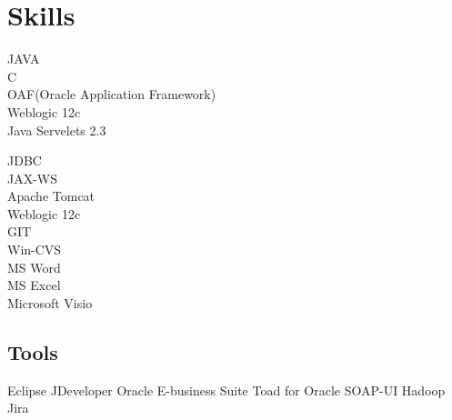 \documentclass[letterpaper]{deedy-resume-openfont}
\begin{document}
\begin{minipage}[t]{0.33\textwidth}

\section{Skills}
\hspace{.5cm} \textbullet{} JAVA\\
\hspace{.5cm} \textbullet{} C\\

\hspace{.5cm}  \textbullet{} OAF(Oracle Application Framework) \\
\hspace{.5cm} \textbullet{} Weblogic 12c\\


\hspace{.5cm} \textbullet{} Java Servelets 2.3\\



\hspace{.5cm} \textbullet{} JDBC\\
\hspace{.5cm} \textbullet{} JAX-WS\\


\hspace{.5cm} \textbullet{} Apache Tomcat\\ 
\hspace{.5cm} \textbullet{} Weblogic 12c\\

\hspace{.5cm} \textbullet{} GIT\\ 
\hspace{.5cm} \textbullet{} Win-CVS\\

\hspace{.5cm} \textbullet{} MS Word\\ 
\hspace{.5cm} \textbullet{} MS Excel\\
\hspace{.5cm} \textbullet{} Microsoft Visio\\

\sectionsep

\sectionsep %

\subsection{Tools}

Eclipse \textbullet{} JDeveloper \textbullet{} Oracle E-business Suite \textbullet{} Toad for Oracle \textbullet{} SOAP-UI \textbullet{} Hadoop \textbullet{} Jira

%
%

\end{minipage} 
\end{document}
